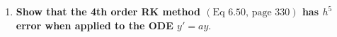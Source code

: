 \documentclass[11pt]{article}
\newenvironment{solution}
  {\renewcommand\qedsymbol{$\blacksquare$}\begin{proof}[Solution]}
  {\end{proof}}
\theoremstyle{definition}
\begin{document}
\begin{enumerate}





        

    \newpage

    \item \textbf{Show that the 4th order RK method $(\text{Eq } 6.50, \, \text{page } 330)$ has $h^5$ error when applied to the ODE $y'=ay.$} 
    

\end{enumerate}
\end{document}
